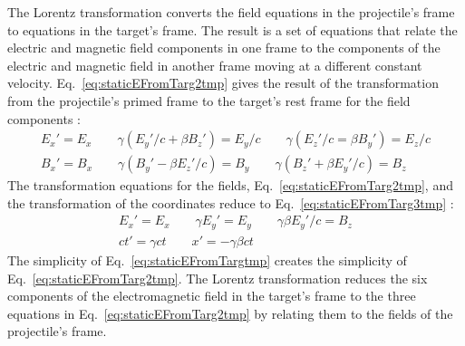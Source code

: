     The Lorentz transformation converts the field equations in the 
      projectile's frame to equations in the target's frame.
    The result is a set of equations that relate the electric and magnetic field
      components in one frame to the components of the electric and magnetic 
      field in another frame moving at a different constant velocity.
    Eq.~\ref{eq:staticEFromTarg2tmp} gives the result of the transformation 
      from the projectile's primed frame to the target's rest frame for 
      the field components \cite{WWJackson}:
    \begin{eqnarray} \label{eq:staticEFromTarg2tmp}
        E_{x}'=E_{x}\qquad
        \gamma\left(E_{y}'/c+\beta B_{z}'\right)=E_{y}/c\qquad
        \gamma\left(E_{z}'/c=\beta B_{y}'\right)=E_{z}/c \nonumber \\
        B_{x}'=B_{x}\qquad
        \gamma\left(B_{y}'-\beta E_{z}'/c\right)=B_{y}\qquad
        \gamma\left(B_{z}'+\beta E_{y}'/c\right)=B_{z}
    \end{eqnarray}
    The transformation equations for the fields, 
      Eq.~\ref{eq:staticEFromTarg2tmp}, and the transformation of the 
      coordinates reduce to Eq.~\ref{eq:staticEFromTarg3tmp} \cite{WWJackson}:
    \begin{eqnarray} \label{eq:staticEFromTarg3tmp}
        E_{x}'=E_{x}\qquad
        \gamma E_{y}'=E_{y}\qquad
        \gamma \beta E_{y}'/c=B_{z}\nonumber \\
        ct'=\gamma ct \qquad
        x'=-\gamma \beta c t
    \end{eqnarray}
    The simplicity of Eq.~\ref{eq:staticEFromTargtmp} creates the simplicity of
      Eq.~\ref{eq:staticEFromTarg2tmp}.
    The Lorentz transformation reduces the six components of the 
      electromagnetic field in the target's frame to the three equations in 
      Eq.~\ref{eq:staticEFromTarg2tmp} by relating them to the fields of the 
      projectile's frame. 
    
